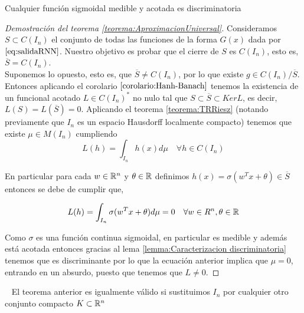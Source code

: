     \begin{lema}\label{lemma:Caracterizacion discriminatoria}
    Cualquier función sigmoidal medible y acotada es discriminatoria
    \end{lema}
    
    \begin{proof}[Demostración del teorema \ref{teorema:AproximacionUniversal}]
    Consideramos $S \subset C(I_n)$ el conjunto de todas las funciones de la forma $G(x)$ dada por 
    $\ref{eq:salidaRNN}$. Nuestro objetivo es probar que el cierre de $S$ es $C(I_n)$, esto es, $\overline{S} = C(I_n)$. \\
    
    Suponemos lo opuesto, esto es, que $\overline{S} \not= C(I_n)$, por lo que existe $g \in C(I_n)/\overline{S}$. Entonces aplicando el corolario $\ref{corolario:Hanh-Banach}$ tenemos la existencia de un funcional acotado ${L \in C(I_n)^*}$ no nulo tal que $S \subset \overline{S} \subset Ker L$, es decir,  ${L(S) = L(\overline{S}) = 0}$. Aplicando el teorema \ref{teorema:TRRiesz} (notando previamente que $I_n$ es un espacio Hausdorff localmente compacto) tenemos que existe $\mu \in M(I_n)$ cumpliendo  
    \begin{equation}
        L(h) = \int_{I_n} h(x) d\mu \quad \forall h \in C(I_n)
    \end{equation}
    
    \noindent En particular para cada $w \in \mathbb{R}^n$ y $\theta \in \mathbb{R}$ definimos $h(x) = \sigma(w^T x + \theta) \in \overline{S}$ entonces se debe de cumplir que,
    
    \begin{equation}
        L(h) = \int_{I_n} \sigma(w^T x + \theta) d\mu = 0 \quad \forall w \in R^n, \theta \in \mathbb{R}
    \end{equation}

    \noindent Como $\sigma$ es una función continua sigmoidal, en particular es medible y además está acotada entonces gracias al lema \ref{lemma:Caracterizacion discriminatoria} tenemos que es discriminante por lo que la ecuación anterior implica que $\mu = 0$, entrando en un absurdo, puesto que tenemos que $L \not= 0$. 
    \end{proof}
    
    \begin{observacion}~\smallskip
    El teorema anterior es igualmente válido si sustituimos $I_n$ por cualquier otro conjunto compacto $K \subset \mathbb{R}^n$
    \end{observacion}
    
